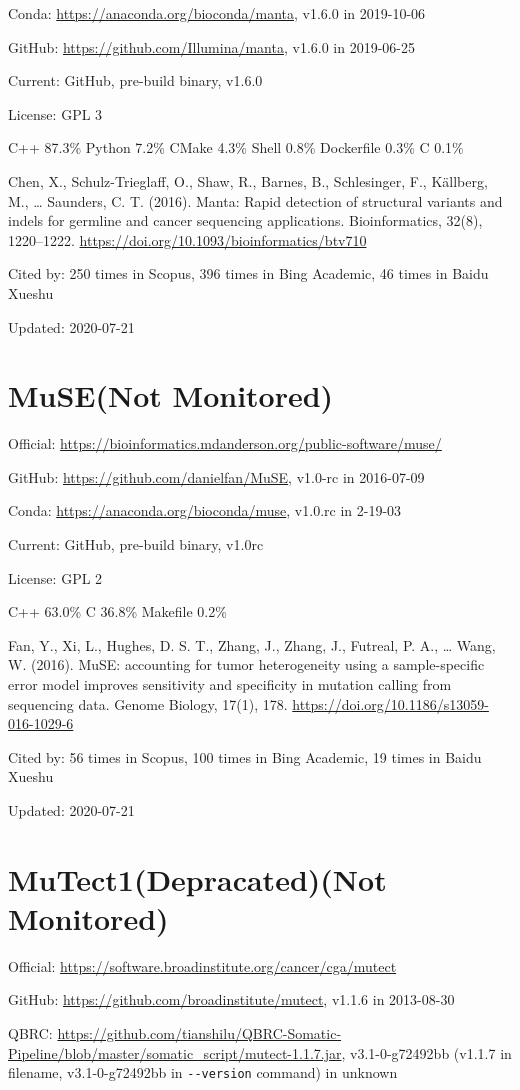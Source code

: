 \documentclass[]{article}
\newcommand{\nm}{{\color{red}(Not Monitored)}}
\newcommand{\de}{{\color{red}(Depracated)}}
\newcommand{\cb}[3]{\par Cited by: {\color{blue}\Huge #1} times in Scopus, {\color{blue}\Huge #2} times in Bing Academic, {\color{blue}\Huge #3} times in Baidu Xueshu}
\begin{document}
Conda: \url{https://anaconda.org/bioconda/manta}, v1.6.0 in 2019-10-06

GitHub: \url{https://github.com/Illumina/manta}, v1.6.0 in 2019-06-25

Current: GitHub, pre-build binary, v1.6.0

License: GPL 3

C++ 87.3\% Python 7.2\% CMake 4.3\% Shell 0.8\% Dockerfile 0.3\% C 0.1\%

Chen, X., Schulz-Trieglaff, O., Shaw, R., Barnes, B., Schlesinger, F., Källberg, M., … Saunders, C. T. (2016). Manta: Rapid detection of structural variants and indels for germline and cancer sequencing applications. Bioinformatics, 32(8), 1220–1222. \url{https://doi.org/10.1093/bioinformatics/btv710}\cb{250}{396}{46}

Updated: 2020-07-21

\section{MuSE\nm}

Official: \url{https://bioinformatics.mdanderson.org/public-software/muse/}

GitHub: \url{https://github.com/danielfan/MuSE}, v1.0-rc in 2016-07-09

Conda: \url{https://anaconda.org/bioconda/muse}, v1.0.rc in 2-19-03

Current: GitHub, pre-build binary, v1.0rc

License: GPL 2

C++ 63.0\% C 36.8\% Makefile 0.2\%

Fan, Y., Xi, L., Hughes, D. S. T., Zhang, J., Zhang, J., Futreal, P. A., … Wang, W. (2016). MuSE: accounting for tumor heterogeneity using a sample-specific error model improves sensitivity and specificity in mutation calling from sequencing data. Genome Biology, 17(1), 178. \url{https://doi.org/10.1186/s13059-016-1029-6}\cb{56}{100}{19}

Updated: 2020-07-21

\section{MuTect1\de\nm}

Official: \url{https://software.broadinstitute.org/cancer/cga/mutect}

GitHub: \url{https://github.com/broadinstitute/mutect}, v1.1.6 in 2013-08-30

QBRC: \url{https://github.com/tianshilu/QBRC-Somatic-Pipeline/blob/master/somatic_script/mutect-1.1.7.jar}, v3.1-0-g72492bb (v1.1.7 in filename, v3.1-0-g72492bb in \verb|--version| command) in unknown
\end{document}
